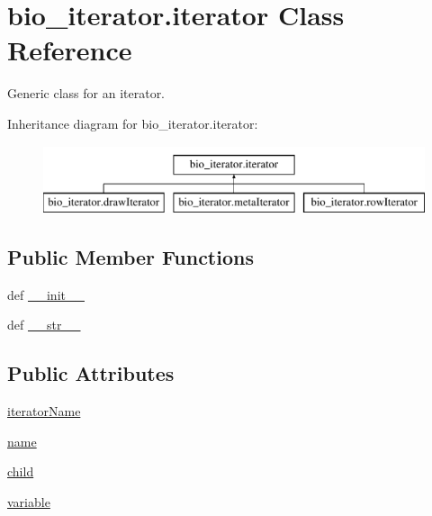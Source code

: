 \hypertarget{classbio__iterator_1_1iterator}{\section{bio\+\_\+iterator.\+iterator Class Reference}
\label{classbio__iterator_1_1iterator}
}


Generic class for an iterator.  


Inheritance diagram for bio\+\_\+iterator.\+iterator\+:\begin{figure}[H]
\begin{center}
\leavevmode
\includegraphics[height=2.000000cm]{d2/dcb/classbio__iterator_1_1iterator}
\end{center}
\end{figure}
\subsection*{Public Member Functions}
\begin{DoxyCompactItemize}
\item 
def \hyperlink{classbio__iterator_1_1iterator_aecf8b6945608caee98de17dca54e3315}{\+\_\+\+\_\+init\+\_\+\+\_\+}
\item 
def \hyperlink{classbio__iterator_1_1iterator_a9f521a484ac8082a4ffee14d9ba2192c}{\+\_\+\+\_\+str\+\_\+\+\_\+}
\end{DoxyCompactItemize}
\subsection*{Public Attributes}
\begin{DoxyCompactItemize}
\item 
\hyperlink{classbio__iterator_1_1iterator_a10e4188d8459b5342d609df5a1267a5d}{iterator\+Name}
\item 
\hyperlink{classbio__iterator_1_1iterator_a0dbadbe5cc949e2bfa25591b22956989}{name}
\item 
\hyperlink{classbio__iterator_1_1iterator_a67a5a5a22ba01bcaa168c9e056eb25d0}{child}
\item 
\hyperlink{classbio__iterator_1_1iterator_a2fd1e60735f344291efbbbf0fbf8a48a}{variable}
\end{DoxyCompactItemize}



